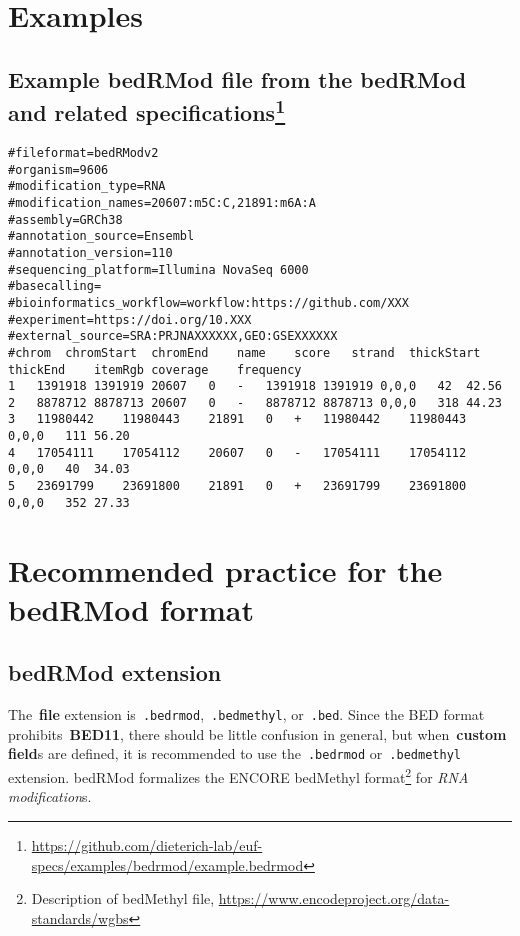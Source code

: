 \documentclass[11pt]{article}
\providecommand*{\Ac}[1]{\ac{#1}} %
\begin{document}
\section{Examples}

\subsection[title]{Example bedRMod file from the \acs{bedRMod} and related specifications\footnote{\url{https://github.com/dieterich-lab/euf-specs/examples/bedrmod/example.bedrmod}}}\label{sec:example-bedrmod}

\begin{verbatim}
#fileformat=bedRModv2
#organism=9606
#modification_type=RNA
#modification_names=20607:m5C:C,21891:m6A:A
#assembly=GRCh38
#annotation_source=Ensembl
#annotation_version=110
#sequencing_platform=Illumina NovaSeq 6000
#basecalling=
#bioinformatics_workflow=workflow:https://github.com/XXX
#experiment=https://doi.org/10.XXX
#external_source=SRA:PRJNAXXXXXX,GEO:GSEXXXXXX
#chrom	chromStart	chromEnd	name	score	strand	thickStart	thickEnd	itemRgb	coverage	frequency
1	1391918	1391919	20607	0	-	1391918	1391919	0,0,0	42	42.56
2	8878712	8878713	20607	0	-	8878712	8878713	0,0,0	318	44.23
3	11980442	11980443	21891	0	+	11980442	11980443	0,0,0	111	56.20
4	17054111	17054112	20607	0	-	17054111	17054112	0,0,0	40	34.03
5	23691799	23691800	21891	0	+	23691799	23691800	0,0,0	352	27.33
\end{verbatim}

\section{Recommended practice for the \acs{bedRMod} format}

\subsection{\acs{bedRMod} extension}
The~\textbf{file} extension is~\texttt{.bedrmod},~\texttt{.bedmethyl}, or~\texttt{.bed}. Since the \ac{BED} format prohibits~\textbf{BED11}, there should be little confusion in general, but when~\textbf{custom field}s are defined, it is recommended to use the~\texttt{.bedrmod} or~\texttt{.bedmethyl} extension. \Ac{bedRMod} formalizes the ENCORE bedMethyl format\footnote{Description of bedMethyl file, \url{https://www.encodeproject.org/data-standards/wgbs}} for \emph{RNA modification}s.
\end{document}
